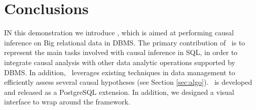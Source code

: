 
\section{Conclusions}
IN this demonstration we introduce \GSQL, which is aimed at
performing causal inference
on Big relational data in DBMS. The primary contribution of \GSQL\ is to represent the main tasks involved with causal inference in SQL, in order to integrate causal analysis with other data analytic operations supported by DBMS.
In addition, \GSQL\ leverages existing techniques
in data management to efficiently assess several causal hypotheses (see Section \ref{sec:algo}). \GSQL\ is developed and released as a PostgreSQL extension. In addition, we designed a visual interface to wrap around the framework.
